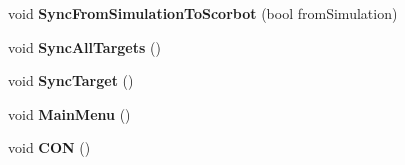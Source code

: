 \begin{DoxyCompactItemize}
\item 
\mbox{\label{class_game_controller_a3e908f52a48528254dddc0f4f4a9d9f8}} 
void {\bfseries Sync\+From\+Simulation\+To\+Scorbot} (bool from\+Simulation)
\item 
\mbox{\label{class_game_controller_ab42ee9c1c07fc60cb506b769bd6047c9}} 
void {\bfseries Sync\+All\+Targets} ()
\item 
\mbox{\label{class_game_controller_afb0be280e9e68853555db2ef42337bd9}} 
void {\bfseries Sync\+Target} ()
\item 
\mbox{\label{class_game_controller_aae26868d4e9c6e735d5fef9cc7b15bb1}} 
void {\bfseries Main\+Menu} ()
\item 
\mbox{\label{class_game_controller_ae9fc70a12ad70871780529854ea12d9c}} 
void {\bfseries C\+ON} ()
\end{DoxyCompactItemize}
